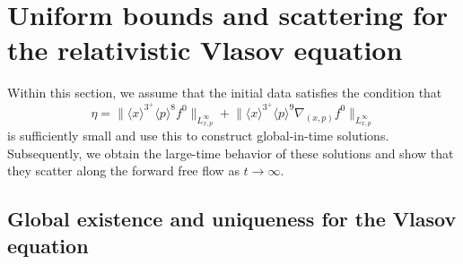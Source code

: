 \documentclass[reqno, 11pt, letterpaper]{amsart}
\theoremstyle{remark}
\numberwithin{equation}{section}
\numberwithin{theorem}{section}
\numberwithin{table}{section}
\numberwithin{figure}{section}
\begin{document}
\section{Uniform bounds and scattering for the relativistic Vlasov equation}\label{sec: {Uniform bounds and scattering for the relativistic Vlasov equation}}

Within this section, we assume that the initial data satisfies the condition that
\begin{equation}\label{eq: initial data assumption2}
\eta = \Big\|\langle x\rangle^{3^+}\langle p \rangle^8 f^0\Big\|_{L_{x,p}^\infty} +\Big\|\langle x\rangle^{3^+}\langle p \rangle^9\nabla_{(x,p)}f^0\Big\|_{L_{x,p}^\infty}
\end{equation}
is sufficiently small and use this to construct global-in-time solutions.
Subsequently, we obtain the large-time behavior of these solutions and show that they scatter along the forward free flow as $t \to \infty$.

\subsection{Global existence and uniqueness for the Vlasov equation}
\label{GE}
\end{document}
